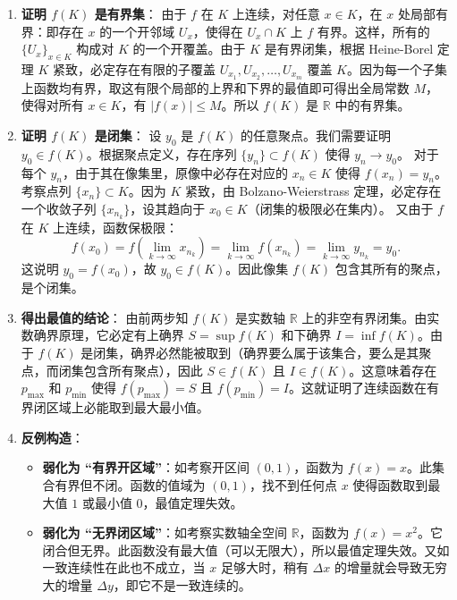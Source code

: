 \documentclass[lang=cn,11pt]{elegantbook}
\begin{document}
\begin{solution}
\begin{enumerate}
  \item[(1)] \textbf{证明 $f(K)$ 是有界集}：
  由于 $f$ 在 $K$ 上连续，对任意 $x \in K$，在 $x$ 处局部有界：即存在 $x$ 的一个开邻域 $U_x$，使得在 $U_x \cap K$ 上 $f$ 有界。这样，所有的 $\{U_x\}_{x \in K}$ 构成对 $K$ 的一个开覆盖。由于 $K$ 是有界闭集，根据 Heine-Borel 定理 $K$ 紧致，必定存在有限的子覆盖 $U_{x_1}, U_{x_2}, \dots, U_{x_m}$ 覆盖 $K$。因为每一个子集上函数均有界，取这有限个局部的上界和下界的最值即可得出全局常数 $M$，使得对所有 $x \in K$，有 $|f(x)| \leqslant  M$。所以 $f(K)$ 是 $\mathbb{R}$ 中的有界集。
  
  \item[(2)] \textbf{证明 $f(K)$ 是闭集}：
  设 $y_0$ 是 $f(K)$ 的任意聚点。我们需要证明 $y_0 \in f(K)$。根据聚点定义，存在序列 $\{y_n\} \subset f(K)$ 使得 $y_n \to y_0$。
  对于每个 $y_n$，由于其在像集里，原像中必存在对应的 $x_n \in K$ 使得 $f(x_n) = y_n$。考察点列 $\{x_n\} \subset K$。因为 $K$ 紧致，由 Bolzano-Weierstrass 定理，必定存在一个收敛子列 $\{x_{n_k}\}$，设其趋向于 $x_0 \in K$（闭集的极限必在集内）。
  又由于 $f$ 在 $K$ 上连续，函数保极限：
  \[
  f(x_0) = f\left(\lim_{k\to\infty}x_{n_k}\right) = \lim_{k\to\infty}f(x_{n_k}) = \lim_{k\to\infty}y_{n_k} = y_0.
  \]
  这说明 $y_0 = f(x_0)$，故 $y_0 \in f(K)$。因此像集 $f(K)$ 包含其所有的聚点，是个闭集。

  \item[(3)] \textbf{得出最值的结论}：
  由前两步知 $f(K)$ 是实数轴 $\mathbb{R}$ 上的非空有界闭集。由实数确界原理，它必定有上确界 $S = \sup f(K)$ 和下确界 $I = \inf f(K)$。由于 $f(K)$ 是闭集，确界必然能被取到（确界要么属于该集合，要么是其聚点，而闭集包含所有聚点），因此 $S \in f(K)$ 且 $I \in f(K)$。这意味着存在 $p_{\max}$ 和 $p_{\min}$ 使得 $f(p_{\max}) = S$ 且 $f(p_{\min}) = I$。这就证明了连续函数在有界闭区域上必能取到最大最小值。

  \item[(4)] \textbf{反例构造}：
  \begin{itemize}
    \item \textbf{弱化为 “有界开区域”}：如考察开区间 $(0,1)$，函数为 $f(x)=x$。此集合有界但不闭。函数的值域为 $(0,1)$，找不到任何点 $x$ 使得函数取到最大值 $1$ 或最小值 $0$，最值定理失效。
    \item \textbf{弱化为 “无界闭区域”}：如考察实数轴全空间 $\mathbb{R}$，函数为 $f(x)=x^2$。它闭合但无界。此函数没有最大值（可以无限大），所以最值定理失效。又如一致连续性在此也不成立，当 $x$ 足够大时，稍有 $\Delta x$ 的增量就会导致无穷大的增量 $\Delta y$，即它不是一致连续的。
  \end{itemize}
\end{enumerate}
\end{solution}
\end{document}
